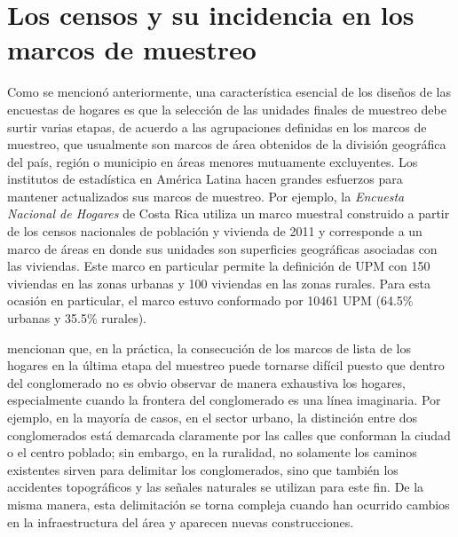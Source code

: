\documentclass[
  12pt,
]{book}
\begin{document}
\hypertarget{los-censos-y-su-incidencia-en-los-marcos-de-muestreo}{%
\section{Los censos y su incidencia en los marcos de muestreo}\label{los-censos-y-su-incidencia-en-los-marcos-de-muestreo}}

Como se mencionó anteriormente, una característica esencial de los diseños de las encuestas de hogares es que la selección de las unidades finales de muestreo debe surtir varias etapas, de acuerdo a las agrupaciones definidas en los marcos de muestreo, que usualmente son marcos de área obtenidos de la división geográfica del país, región o municipio en áreas menores mutuamente excluyentes. Los institutos de estadística en América Latina hacen grandes esfuerzos para mantener actualizados sus marcos de muestreo. Por ejemplo, la \emph{Encuesta Nacional de Hogares} de Costa Rica utiliza un marco muestral construido a partir de los censos nacionales de población y vivienda de 2011 y corresponde a un marco de áreas en donde sus unidades son superficies geográficas asociadas con las viviendas. Este marco en particular permite la definición de UPM con 150 viviendas en las zonas urbanas y 100 viviendas en las zonas rurales. Para esta ocasión en particular, el marco estuvo conformado por 10461 UPM (64.5\% urbanas y 35.5\% rurales).

\citet{Gambino_Silva_2009} mencionan que, en la práctica, la consecución de los marcos de lista de los hogares en la última etapa del muestreo puede tornarse difícil puesto que dentro del conglomerado no es obvio observar de manera exhaustiva los hogares, especialmente cuando la frontera del conglomerado es una línea imaginaria. Por ejemplo, en la mayoría de casos, en el sector urbano, la distinción entre dos conglomerados está demarcada claramente por las calles que conforman la ciudad o el centro poblado; sin embargo, en la ruralidad, no solamente los caminos existentes sirven para delimitar los conglomerados, sino que también los accidentes topográficos y las señales naturales se utilizan para este fin. De la misma manera, esta delimitación se torna compleja cuando han ocurrido cambios en la infraestructura del área y aparecen nuevas construcciones.
\end{document}
